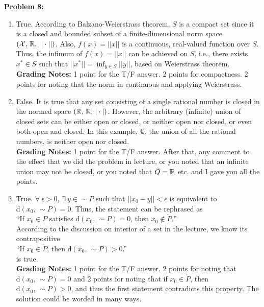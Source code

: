 \documentclass[letterpaper]{article}
\begin{document}
\newpage

\noindent \textbf{Problem 8:}
\begin{enumerate}
    \setlength{\itemsep}{.15in}
    \renewcommand{\labelenumi}{(\alph{enumi})}
    \setlength{\itemsep}{.1in}
  \item True. According to Balzano-Weierstrass theorem, $S$ is a compact set since it is a closed and bounded subset of a finite-dimensional norm space $({\cal X},\,\mathbb R,\, || \cdot||)$. Also, $f(x)=||x||$ is a continuous, real-valued function over $S$. Thus, the infimum of $f(x)=||x||$ can be achieved on $S$, i.e., there exists $x^* \in S$ such that $||x^*||=\inf_{y\in S} ||y||$, based on Weierstrass theorem.\\

      \textbf{Grading Notes:} 1 point for the T/F answer. 2 points for compactness. 2 points for noting that the norm in continuous and applying Weierstrass.

  \item False. It is true that any set consisting of a single rational number is closed in the normed space $(\mathbb R,\,\mathbb R,\, |\cdot|)$. However, the arbitrary (infinite) union of closed sets can be either open or closed, or neither open nor closed, or even both open and closed. In this example, $\mathbb{Q}$, the union of all the rational numbers, is neither open nor closed.\\



      \textbf{Grading Notes:} 1 point for the T/F answer. After that, any comment to the effect that we did the problem in lecture, or you noted that an infinite union may not be closed, or you noted that $\bar{Q}=\mathbb R$ etc. and I gave you all the points.

  \item True. $\forall~\epsilon>0$, $\exists~y \in \sim P$ such that $||x_0 - y||< \epsilon$ is equivalent to $\mathrm{d}(x_0,\,\sim P)=0$. Thus, the statement can be rephrased as \\
      \hspace*{2cm} ``If $x_0\in P$ satisfies $\mathrm{d}(x_0,\,\sim P)=0$, then  $x_0\not \in  \mathring{P}.$''\\
      According to the discussion on interior of a set in the lecture, we know its contrapositive \\
      \hspace*{2cm} ``If $x_0\in  \mathring{P}$, then $\mathrm{d}(x_0,\,\sim P)>0$.''\\
      is true.
      \\

      \textbf{Grading Notes:} 1 point for the T/F answer. 2 points for noting that $\mathrm{d}(x_0,\,\sim P)=0$ and 2 points for noting that if $x_0\in  \mathring{P}$, then $\mathrm{d}(x_0,\,\sim P)>0$, and thus the first statement contradicts this property. The solution could be worded in many ways.
\end{enumerate}
\end{document}
